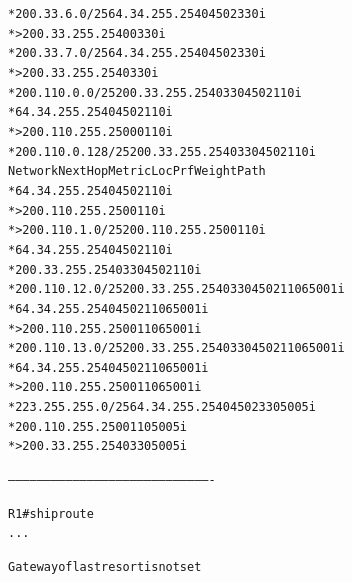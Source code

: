 \documentclass[12pt,twoside,a4paper]{report}
\begin{document}
{\begin{small}
\begin{alltt}
*  200.33.6.0/25    64.34.255.254                          0 4502 330 i
*>                  200.33.255.254           0             0 330 i
*  200.33.7.0/25    64.34.255.254                          0 4502 330 i
*>                  200.33.255.254                         0 330 i
*  200.110.0.0/25   200.33.255.254                         0 330 4502 110 i
*                   64.34.255.254                          0 4502 110 i
*>                  200.110.255.250          0             0 110 i
*  200.110.0.128/25   200.33.255.254                         0 330 4502 110 i
   Network          Next Hop            Metric LocPrf Weight Path
*                   64.34.255.254                          0 4502 110 i
*>                  200.110.255.250                        0 110 i
*> 200.110.1.0/25   200.110.255.250                        0 110 i
*                   64.34.255.254                          0 4502 110 i
*                   200.33.255.254                         0 330 4502 110 i
*  200.110.12.0/25  200.33.255.254                         0 330 4502 110 65001 i
*                   64.34.255.254                          0 4502 110 65001 i
*>                  200.110.255.250                        0 110 65001 i
*  200.110.13.0/25  200.33.255.254                         0 330 4502 110 65001 i
*                   64.34.255.254                          0 4502 110 65001 i
*>                  200.110.255.250                        0 110 65001 i
*  223.255.255.0/25 64.34.255.254                          0 4502 330 5005 i
*                   200.110.255.250                        0 110 5005 i
*>                  200.33.255.254                         0 330 5005 i


-------------------------------------------------------------------------------------


R1#sh ip route            
...

Gateway of last resort is not set


\end{alltt}
\end{small}}
\end{document}
